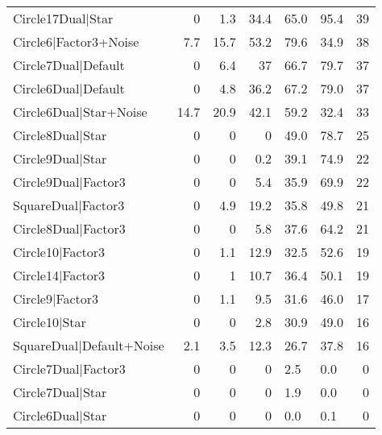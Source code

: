 \begin{tabular}{lrrrllr}
 Circle17Dual|Star          &             0   &            1.3 &            34.4 & 65.0            & 95.4            &           39 \\
 Circle6|Factor3+Noise      &             7.7 &           15.7 &            53.2 & 79.6            & 34.9            &           38 \\
 Circle7Dual|Default        &             0   &            6.4 &            37   & 66.7            & 79.7            &           37 \\
 Circle6Dual|Default        &             0   &            4.8 &            36.2 & 67.2            & 79.0            &           37 \\
 Circle6Dual|Star+Noise     &            14.7 &           20.9 &            42.1 & 59.2            & 32.4            &           33 \\
 Circle8Dual|Star           &             0   &            0   &             0   & 49.0            & 78.7            &           25 \\
 Circle9Dual|Star           &             0   &            0   &             0.2 & 39.1            & 74.9            &           22 \\
 Circle9Dual|Factor3        &             0   &            0   &             5.4 & 35.9            & 69.9            &           22 \\
 SquareDual|Factor3         &             0   &            4.9 &            19.2 & 35.8            & 49.8            &           21 \\
 Circle8Dual|Factor3        &             0   &            0   &             5.8 & 37.6            & 64.2            &           21 \\
 Circle10|Factor3           &             0   &            1.1 &            12.9 & 32.5            & 52.6            &           19 \\
 Circle14|Factor3           &             0   &            1   &            10.7 & 36.4            & 50.1            &           19 \\
 Circle9|Factor3            &             0   &            1.1 &             9.5 & 31.6            & 46.0            &           17 \\
 Circle10|Star              &             0   &            0   &             2.8 & 30.9            & 49.0            &           16 \\
 SquareDual|Default+Noise   &             2.1 &            3.5 &            12.3 & 26.7            & 37.8            &           16 \\
 Circle7Dual|Factor3        &             0   &            0   &             0   & 2.5             & 0.0             &            0 \\
 Circle7Dual|Star           &             0   &            0   &             0   & 1.9             & 0.0             &            0 \\
 Circle6Dual|Star           &             0   &            0   &             0   & 0.0             & 0.1             &            0 \\
\hline
\end{tabular}